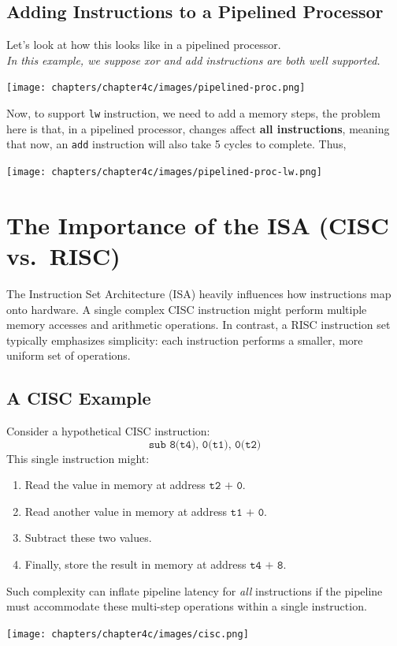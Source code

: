 \subsection{Adding Instructions to a Pipelined Processor}
Let's look at how this looks like in a pipelined processor.\\
\textit{In this example, we suppose xor and add instructions are both well supported.}
\begin{center}
    \texttt{[image: chapters/chapter4c/images/pipelined-proc.png]}
\end{center}
Now, to support \texttt{lw} instruction, we need to add a memory steps, the problem here is that, in a pipelined processor, changes affect \textbf{all instructions}, meaning that now, an \texttt{add} instruction will also take 5 cycles to complete. Thus,
\begin{center}
    \texttt{[image: chapters/chapter4c/images/pipelined-proc-lw.png]}
\end{center}

\section{The Importance of the ISA (CISC vs.\ RISC)}
The Instruction Set Architecture (ISA) heavily influences how instructions map onto hardware. A single complex CISC instruction might perform multiple memory accesses and arithmetic operations. In contrast, a RISC instruction set typically emphasizes simplicity: each instruction performs a smaller, more uniform set of operations.

\subsection{A CISC Example}
Consider a hypothetical CISC instruction:
\[
\texttt{sub 8(t4), 0(t1), 0(t2)}
\]
This single instruction might:
\begin{enumerate}
    \item Read the value in memory at address \(\texttt{t2 + 0}\).
    \item Read another value in memory at address \(\texttt{t1 + 0}\).
    \item Subtract these two values.
    \item Finally, store the result in memory at address \(\texttt{t4 + 8}\).
\end{enumerate}
Such complexity can inflate pipeline latency for \emph{all} instructions if the pipeline must accommodate these multi-step operations within a single instruction.
\begin{center}
    \texttt{[image: chapters/chapter4c/images/cisc.png]}
\end{center}
